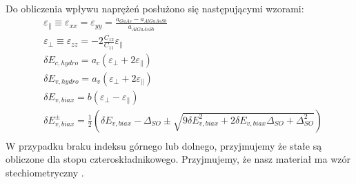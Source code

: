 \documentclass[12pt,openany,a4paper]{book}
\begin{document}
  
Do obliczenia wpływu naprężeń posłużono się następującymi wzorami:
\begin{align*}
	&\varepsilon_{\parallel } \equiv \varepsilon_{xx} = \varepsilon_{yy} = \frac{a_{GaAs} - a_{AlGaAsSb}}{a_{AlGaAsSb}}\\
	&\varepsilon_{\perp } \equiv \varepsilon_{zz} = -2\frac{C_{12}}{C_{11}}\varepsilon_{\parallel}\\
	&\delta E_{c,hydro} = a_c\left(\varepsilon_{\perp} + 2\varepsilon_{\parallel}\right)\\
	&\delta E_{v,hydro} = a_v\left(\varepsilon_{\perp} + 2\varepsilon_{\parallel}\right)\\
	&\delta E_{v,biax} = b\left(\varepsilon_{\perp} - \varepsilon_{\parallel}\right)\\
	&\delta E_{v,biax}^{\pm} = \frac{1}{2}\left(\delta E_{v,biax} - \Delta_{SO} \pm \sqrt{9\delta E_{v,biax}^2 + 2\delta E_{v,biax} \Delta_{SO} + \Delta_{SO}^2 }\right)\\
\end{align*}
W przypadku braku indeksu górnego lub dolnego, przyjmujemy że stałe są obliczone
dla stopu czteroskładnikowego. Przyjmujemy, że nasz materiał ma wzór stechiometryczny
.
\end{document}
